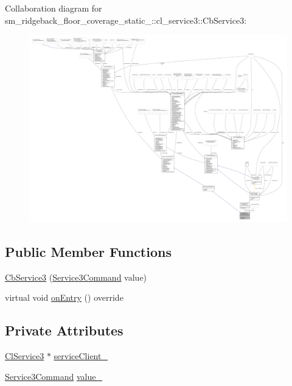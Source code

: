 Collaboration diagram for sm\+\_\+ridgeback\+\_\+floor\+\_\+coverage\+\_\+static\+\_\+:\+:cl\+\_\+service3\+:\+:Cb\+Service3\+:
\nopagebreak
\begin{figure}[H]
\begin{center}
\leavevmode
\includegraphics[width=350pt]{classsm__ridgeback__floor__coverage__static__1_1_1cl__service3_1_1CbService3__coll__graph}
\end{center}
\end{figure}
\subsection*{Public Member Functions}
\begin{DoxyCompactItemize}
\item 
\hyperlink{classsm__ridgeback__floor__coverage__static__1_1_1cl__service3_1_1CbService3_a68bc48acd63a5f06972d70b002dd756f}{Cb\+Service3} (\hyperlink{namespacesm__ridgeback__floor__coverage__static__1_1_1cl__service3_aaba74bbc34b595ed42909975cedd5961}{Service3\+Command} value)
\item 
virtual void \hyperlink{classsm__ridgeback__floor__coverage__static__1_1_1cl__service3_1_1CbService3_a0eda2e4af98ebc090234b7f7eacced89}{on\+Entry} () override
\end{DoxyCompactItemize}
\subsection*{Private Attributes}
\begin{DoxyCompactItemize}
\item 
\hyperlink{classsm__ridgeback__floor__coverage__static__1_1_1cl__service3_1_1ClService3}{Cl\+Service3} $\ast$ \hyperlink{classsm__ridgeback__floor__coverage__static__1_1_1cl__service3_1_1CbService3_aabf21a061de68683b96bb96e6d5d88ad}{service\+Client\+\_\+}
\item 
\hyperlink{namespacesm__ridgeback__floor__coverage__static__1_1_1cl__service3_aaba74bbc34b595ed42909975cedd5961}{Service3\+Command} \hyperlink{classsm__ridgeback__floor__coverage__static__1_1_1cl__service3_1_1CbService3_a845615b00a06fa3d08fff04282572348}{value\+\_\+}
\end{DoxyCompactItemize}

